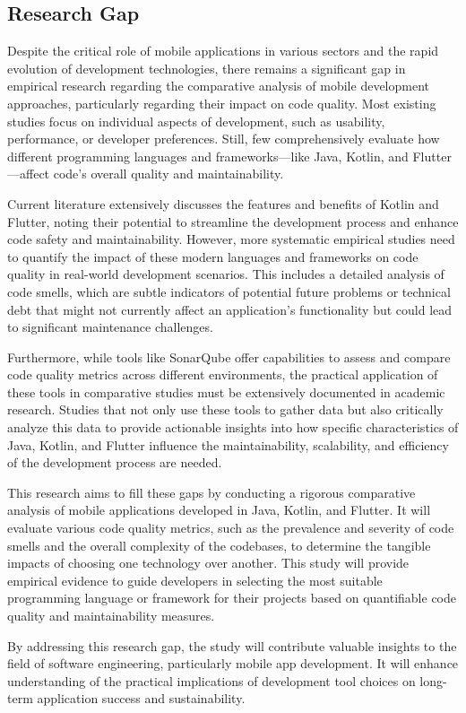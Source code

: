 \subsection{Research Gap}
Despite the critical role of mobile applications in various sectors and the rapid evolution of development technologies, there remains a significant gap in empirical research regarding the comparative analysis of mobile development approaches, particularly regarding their impact on code quality. Most existing studies focus on individual aspects of development, such as usability, performance, or developer preferences. Still, few comprehensively evaluate how different programming languages and frameworks—like Java, Kotlin, and Flutter—affect code's overall quality and maintainability.
\par
Current literature extensively discusses the features and benefits of Kotlin and Flutter, noting their potential to streamline the development process and enhance code safety and maintainability. However, more systematic empirical studies need to quantify the impact of these modern languages and frameworks on code quality in real-world development scenarios. This includes a detailed analysis of code smells, which are subtle indicators of potential future problems or technical debt that might not currently affect an application's functionality but could lead to significant maintenance challenges.
\par
Furthermore, while tools like SonarQube offer capabilities to assess and compare code quality metrics across different environments, the practical application of these tools in comparative studies must be extensively documented in academic research. Studies that not only use these tools to gather data but also critically analyze this data to provide actionable insights into how specific characteristics of Java, Kotlin, and Flutter influence the maintainability, scalability, and efficiency of the development process are needed.
\par
This research aims to fill these gaps by conducting a rigorous comparative analysis of mobile applications developed in Java, Kotlin, and Flutter. It will evaluate various code quality metrics, such as the prevalence and severity of code smells and the overall complexity of the codebases, to determine the tangible impacts of choosing one technology over another. This study will provide empirical evidence to guide developers in selecting the most suitable programming language or framework for their projects based on quantifiable code quality and maintainability measures.
\par
By addressing this research gap, the study will contribute valuable insights to the field of software engineering, particularly mobile app development. It will enhance understanding of the practical implications of development tool choices on long-term application success and sustainability.
